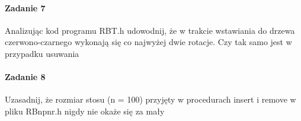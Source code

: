 \documentclass[18pt]{extarticle}
\begin{document}
\paragraph{Zadanie 7} Analizując kod programu RBT.h udowodnij, że w trakcie wstawiania do drzewa czerwono-czarnego wykonają się co najwyżej dwie rotacje. Czy tak samo jest w przypadku usuwania


\paragraph{Zadanie 8} Uzasadnij, że rozmiar stosu (n = 100) przyjęty w procedurach insert i remove w pliku RBnpnr.h nigdy nie okaże się za mały
\end{document}
